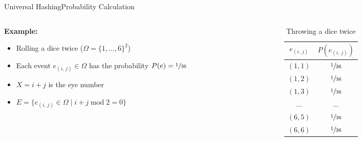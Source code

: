 \begin{frame}{Universal Hashing}{Probability Calculation}
  \begin{columns}
    \begin{column}{0.65\linewidth}
      \textbf{Example:}
      \begin{itemize}
        \item
          Rolling a dice twice ({\color{Mittel-Blau}$\Omega = \{1,\dots,6\}^2$})
        \item
          Each event {\color{Mittel-Blau}$e_{(i,\,j)} \in \Omega$} has the probability
          {\color{Mittel-Blau}$P(e) = \sfrac{1}{36}$}
        \item
          {\color{Mittel-Blau}$X = i + j$} is the eye number
        \item
          {\color{Mittel-Blau}
          \begin{math}
            E = \{e_{(i,\,j)} \in \Omega
              \mid i + j \;\mathrm{mod}\; 2 = 0\}
          \end{math}}
      \end{itemize}
    \end{column}
    \begin{column}{0.35\linewidth}
      \begin{table}[!h]
        \caption{Throwing a dice twice}
        \label{tab:probabilities_rolling_dice_twice}
        \begin{tabularx}{0.8\linewidth}{c|c}
          {\color{Mittel-Blau}$e_{(i,\,j)}$} &{\color{Mittel-Blau} $P(e_{(i,\,j)})$}\\
          \midrule
          $(1, 1)$ & $\sfrac{1}{36}$\\
          $(1, 2)$ & $\sfrac{1}{36}$\\
          $(1, 3)$ & $\sfrac{1}{36}$\\
          $\dots$ & $\dots$\\
          $(6, 5)$ & $\sfrac{1}{36}$\\
          $(6, 6)$ & $\sfrac{1}{36}$\\
        \end{tabularx}
      \end{table}
    \end{column}
  \end{columns}
\end{frame}


